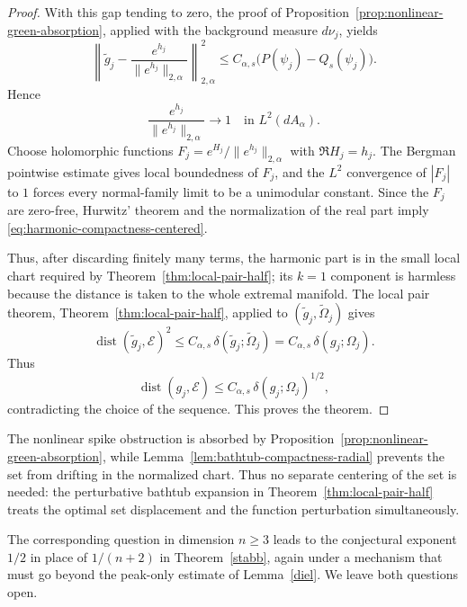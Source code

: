 \documentclass[a4paper,10pt]{amsart}
\begin{document}
\begin{proof}
With this gap tending to zero, the proof of
Proposition~\ref{prop:nonlinear-green-absorption}, applied with the background
measure $d\nu_j$, yields
\[
\left\|
\widetilde g_j-
\frac{e^{h_j}}{\|e^{h_j}\|_{2,\alpha}}
\right\|_{2,\alpha}^2
\le
C_{\alpha,s}\bigl(P(\psi_j)-Q_s(\psi_j)\bigr).
\]
Hence
\[
\frac{e^{h_j}}{\|e^{h_j}\|_{2,\alpha}}\to1
\quad\text{in }L^2(dA_\alpha).
\]
Choose holomorphic functions $F_j=e^{H_j}/\|e^{h_j}\|_{2,\alpha}$ with
$\Re H_j=h_j$. The Bergman pointwise estimate gives local boundedness of
$F_j$, and the $L^2$ convergence of $|F_j|$ to $1$ forces every normal-family
limit to be a unimodular constant. Since the $F_j$ are zero-free, Hurwitz'
theorem and the normalization of the real part imply
\eqref{eq:harmonic-compactness-centered}.

Thus, after discarding finitely many terms, the harmonic part is in the small
local chart required by Theorem~\ref{thm:local-pair-half}; its $k=1$ component
is harmless because the distance is taken to the whole extremal manifold. The
local pair theorem,
Theorem~\ref{thm:local-pair-half}, applied to
$(\widetilde g_j,\widetilde\Omega_j)$ gives
\[
\operatorname{dist}(\widetilde g_j,\mathcal E)^2
\le
C_{\alpha,s}\,\delta(\widetilde g_j;\widetilde\Omega_j)
=
C_{\alpha,s}\,\delta(g_j;\Omega_j).
\]
Thus
\[
\operatorname{dist}(g_j,\mathcal E)
\le
C_{\alpha,s}\,\delta(g_j;\Omega_j)^{1/2},
\]
contradicting the choice of the sequence. This proves the theorem.
\end{proof}

\begin{numrem}
The nonlinear spike obstruction is absorbed by
Proposition~\ref{prop:nonlinear-green-absorption}, while
Lemma~\ref{lem:bathtub-compactness-radial} prevents the set from drifting in
the normalized chart. Thus no separate centering of the set is needed: the
perturbative bathtub expansion in Theorem~\ref{thm:local-pair-half} treats the
optimal set displacement and the function perturbation simultaneously.
\end{numrem}

The corresponding question in dimension $n\ge 3$ leads to the conjectural
exponent $1/2$ in place of $1/(n+2)$ in Theorem~\ref{stabb}, again under a
mechanism that must go beyond the peak-only estimate of Lemma~\ref{diel}. We
leave both questions open.

\end{document}
